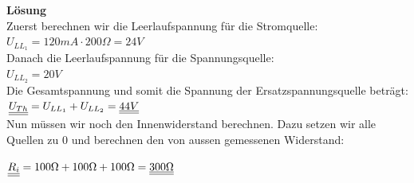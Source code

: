 																				\begin{center}
																					\fix
																				\end{center}
																				\iend
																				\beginip
																				\textbf{Lösung}
																				\\
																				Zuerst berechnen wir die Leerlaufspannung für die Stromquelle: \\
																				$U_{LL_1} = 120mA \cdot 200 \Omega = 24V$ \\
																				Danach die Leerlaufspannung für die Spannungsquelle: \\
																				$ U_{LL_2} = 20V$\\
																				Die Gesamtspannung und somit die Spannung der Ersatzspannungsquelle beträgt: \\
																				$\underline{\underline{U_{Th}}} = U_{LL_1} + U_{LL_2} = \underline{\underline{44V}}$ \\

																				Nun müssen wir noch den Innenwiderstand berechnen. Dazu setzen wir alle Quellen zu 0 und berechnen den von aussen gemessenen Widerstand:\\
																				\begin{center}
																					\fix
																				\end{center}
																									$\underline{\underline{R_i}} = 100\Omega + 100\Omega  + 100\Omega  = \underline{\underline{300 \Omega}} $
																				\iend


